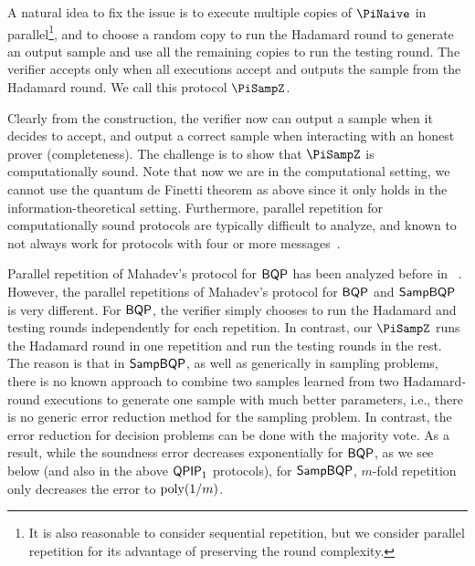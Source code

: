  A natural idea to fix the issue is to execute multiple copies of $\PiNaive$ in parallel\footnote{It is also reasonable to consider sequential repetition, but we consider parallel repetition for its advantage of preserving the round complexity.}, and to choose a random copy to run the Hadamard round to generate an output sample and use all the remaining copies to run the testing round. The verifier accepts only when all executions accept and outputs the sample from the Hadamard round. We call this protocol $\PiSampZ$.

Clearly from the construction, the verifier now can output a sample when it decides to accept, and output a correct sample when interacting with an honest prover (completeness). The challenge is to show that $\PiSampZ$ is computationally sound. Note that now we are in the computational setting, we cannot use the quantum de Finetti theorem as above since it only holds in the information-theoretical setting. Furthermore, parallel repetition for computationally sound protocols are typically difficult to analyze, and known to not always work for protocols with four or more messages~\cite{BIN97,PW12}.


 Parallel repetition of Mahadev's protocol for $\operatorname{\mathsf{BQP}}$ has been analyzed before in ~\cite{arXiv:ChiaChungYam19, arXiv:AlaChiHun19}. However, the parallel repetitions of Mahadev's protocol for $\operatorname{\mathsf{BQP}}$ and $\operatorname{\mathsf{SampBQP}}$ is very different. For $\operatorname{\mathsf{BQP}}$, the verifier simply chooses to run the Hadamard and testing rounds independently for each repetition. In contrast, our $\PiSampZ$ runs the Hadamard round in one repetition and run the testing rounds in the rest. The reason is that in $\operatorname{\mathsf{SampBQP}}$, as well as generically in sampling problems, there is no known approach to combine two samples learned from two Hadamard-round executions to generate one sample with much better parameters, i.e., there is no generic error reduction method for the sampling problem. 
In contrast, the error reduction for decision problems can be done with the majority vote. 
As a result, while the soundness error decreases exponentially for $\operatorname{\mathsf{BQP}}$, as we see below (and also in the above $\operatorname{\mathsf{QPIP}}_1$ protocols), for $\operatorname{\mathsf{SampBQP}}$, $m$-fold repetition only decreases the error to $\operatorname*{\operatorname{poly}}(1/m)$. 


